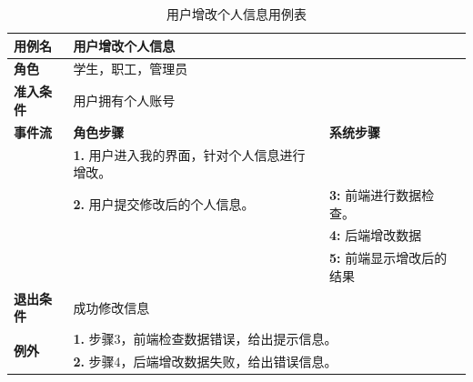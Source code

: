 \begin{table}[H]
  \centering
  \renewcommand\arraystretch{1.1}
  \small
  \caption{用户增改个人信息用例表}
  \setlength{\tabcolsep}{4mm}
  \begin{tabular}{|p{2cm}|p{5.75cm}|p{5.75cm}|}
    \hline \textbf{用例名} & \multicolumn{2}{l|}{用户增改个人信息} \\
    \hline \textbf{角色} & \multicolumn{2}{l|}{学生，职工，管理员} \\
    \hline \textbf{准入条件} & \multicolumn{2}{l|}{用户拥有个人账号} \\
    \hline \textbf{事件流} & \textbf{角色步骤} & \textbf{系统步骤} \\
    \hline \multirow{3}{*}{~} & \textbf{1.} 用户进入我的界面，针对个人信息进行增改。  &    \\
    \cline{2-3} & \textbf{2.} 用户提交修改后的个人信息。 & \textbf{3:} 前端进行数据检查。 \\
    \cline{2-3} &  & \textbf{4:} 后端增改数据 \\
    \cline{2-3} &  & \textbf{5:} 前端显示增改后的结果 \\
    \hline \textbf{退出条件}  & \multicolumn{2}{l|}{成功修改信息} \\
    \hline \multirow{2}{*}{\textbf{例外}} & \multicolumn{2}{l|}{\textbf{1.} 步骤3，前端检查数据错误，给出提示信息。} \\
     & \multicolumn{2}{l|}{\textbf{2.} 步骤4，后端增改数据失败，给出错误信息。} \\
    \hline
  \end{tabular}
\end{table}

